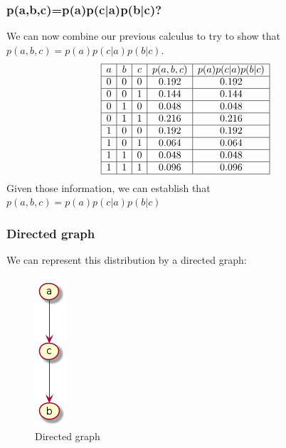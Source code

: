 \documentclass{article}
\begin{document}
            \subsubsection{p(a,b,c)=p(a)p(c|a)p(b|c)?}
                We can now combine our previous calculus to try to show that $p(a,b,c)=p(a)p(c|a)p(b|c)$.
                \[
                    \begin{array}{|c|c|c|c|c|}
                        \hline
                        a & b & c & p(a, b, c) & p(a)p(c|a)p(b|c) \\
                        \hline
                        0 & 0 & 0 & 0.192 & 0.192 \\
                        \hline
                        0 & 0 & 1 & 0.144 & 0.144 \\
                        \hline
                        0 & 1 & 0 & 0.048 & 0.048 \\
                        \hline
                        0 & 1 & 1 & 0.216 & 0.216 \\
                        \hline
                        1 & 0 & 0 & 0.192 & 0.192 \\
                        \hline
                        1 & 0 & 1 & 0.064 & 0.064 \\
                        \hline
                        1 & 1 & 0 & 0.048 & 0.048 \\
                        \hline
                        1 & 1 & 1 & 0.096 & 0.096 \\
                        \hline
                    \end{array}
                \]
                Given those information, we can establish that $p(a,b,c)=p(a)p(c|a)p(b|c)$
            \subsubsection{Directed graph}
                We can represent this distribution by a directed graph:
                \begin{figure}[H]
                    \centering
                    \includegraphics[scale=0.5]{problem1/graph.png}
                    \caption{Directed graph}
                \end{figure}
\end{document}
